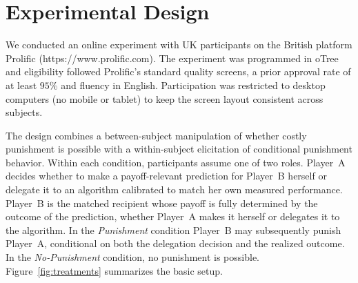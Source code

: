 \section{Experimental Design} \label{design}

We conducted an online experiment with UK participants on the British platform Prolific (https://www.prolific.com). The experiment was programmed in oTree~\citep{chen_otree_2016} and eligibility followed Prolific's standard quality screens, a prior approval rate of at least $95\%$ and fluency in English. Participation was restricted to desktop computers (no mobile or tablet) to keep the screen layout consistent across subjects.

The design combines a between-subject manipulation of whether costly punishment is possible with a within-subject elicitation of conditional punishment behavior. Within each condition, participants assume one of two roles. Player~A decides whether to make a payoff-relevant prediction for Player~B herself or delegate it to an algorithm calibrated to match her own measured performance. Player~B is the matched recipient whose payoff is fully determined by the outcome of the prediction, whether Player~A makes it herself or delegates it to the algorithm. In the \textit{Punishment} condition Player~B may subsequently punish Player~A, conditional on both the delegation decision and the realized outcome. In the \textit{No-Punishment} condition, no punishment is possible. Figure~\ref{fig:treatments} summarizes the basic setup.


